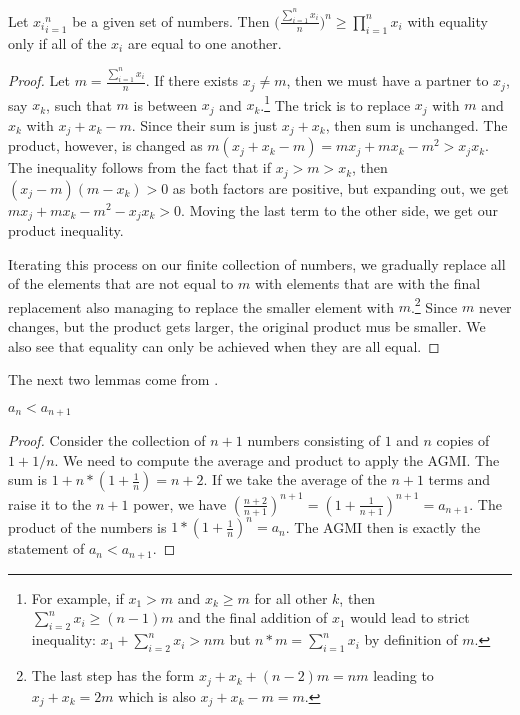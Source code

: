 \documentclass[12pt]{article}
\begin{document}
\begin{proposition}
    Let ${x_i}_{i=1}^n$ be a given set of numbers. Then $\big(\frac{\sum_{i=1}^n x_i}{n}\big)^n \geq  \prod_{i=1}^n x_i$ with equality only if all of the $x_i$ are equal to one another. 
\end{proposition}

\begin{proof}
    Let $m = \frac{\sum_{i=1}^n x_i}{n}$. If there exists $x_j \neq m$, then we must have a partner to $x_j$, say $x_k$, such that $m$ is between $x_j$ and $x_k$.\footnote{For example, if $x_1 > m$ and $x_k \geq m$ for all other $k$, then $\sum_{i=2}^n x_i \geq (n-1) m$ and the final addition of $x_1$ would lead to strict inequality: $x_1 + \sum_{i=2}^n x_i > n m$ but $n*m = \sum_{i=1}^n x_i$ by definition of $m$.} The trick is to replace $x_j$ with $m$ and $x_k$ with $x_j + x_k - m$. Since their sum is just $x_j + x_k$, then sum is unchanged. The product, however, is changed as $m(x_j + x_k - m) = mx_j + m x_k - m^2 > x_j x_k$. The inequality follows from the fact that if $x_j > m > x_k$, then $(x_j - m)(m-x_k) > 0$ as both factors are positive, but expanding out, we get $m x_j + mx_k - m^2 - x_j x_k > 0$. Moving the last term to the other side, we get our product inequality. 

    Iterating this process on our finite collection of numbers, we gradually replace all of the elements that are not equal to $m$ with elements that are with the final replacement also managing to replace the smaller element with $m$.\footnote{The last step has the form $x_j + x_k + (n-2)m = n m$ leading to $x_j +x_k = 2m$ which is also $x_j + x_k - m = m$.} Since $m$ never changes, but the product gets larger, the original product mus be smaller. We also see that equality can only be achieved when they are all equal.  
\end{proof}


The next two lemmas come from \cite{mend}.

\begin{lemma}
  $ a_n < a_{n+1}$ 
\end{lemma}

\begin{proof}
Consider the collection of $n+1$ numbers consisting of $1$ and $n$ copies of $1+1/n$. We need to compute the average and product to apply the AGMI. The sum is $1 + n* (1 + \frac{1}{n} ) = n+2$. If we take the average of the $n+1$ terms and raise it to the $n+1$ power, we have $(\frac{n+2}{n+1})^{n+1} = (1 + \frac{1}{n+1})^{n+1} = a_{n+1}$. The product of the numbers is $1*(1+\frac{1}{n})^n = a_n$. The AGMI then is exactly the statement of $a_n < a_{n+1}$.
\end{proof}
\end{document}

